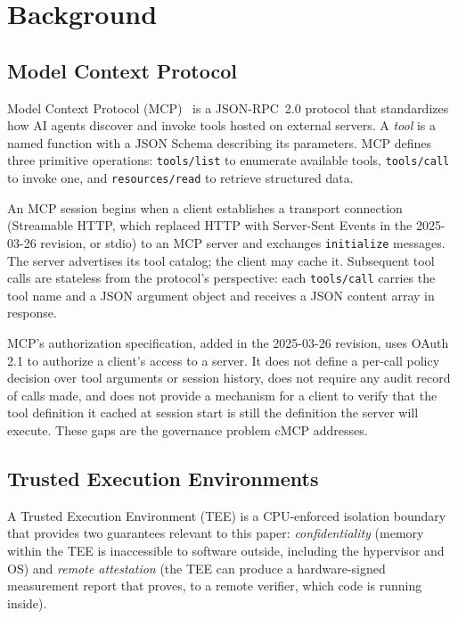 \section{Background}
\label{sec:background}

\subsection{Model Context Protocol}

Model Context Protocol (MCP)~\citep{mcp2024} is a JSON-RPC~2.0 protocol that standardizes
how AI agents discover and invoke tools hosted on external servers. A \emph{tool} is a named
function with a JSON Schema describing its parameters. MCP defines three primitive operations:
\texttt{tools/list} to enumerate available tools, \texttt{tools/call} to invoke one, and
\texttt{resources/read} to retrieve structured data.

An MCP session begins when a client establishes a transport connection (Streamable HTTP,
which replaced HTTP with Server-Sent Events in the 2025-03-26 revision, or stdio) to an MCP
server and exchanges \texttt{initialize} messages.
The server advertises its tool catalog; the client may cache it. Subsequent tool calls are
stateless from the protocol's perspective: each \texttt{tools/call} carries the tool name
and a JSON argument object and receives a JSON content array in response.

MCP's authorization specification, added in the 2025-03-26 revision, uses OAuth 2.1 to
authorize a client's access to a server. It does not define a per-call policy decision over
tool arguments or session history, does not require any audit record of calls made, and
does not provide a mechanism for a client to verify that the tool definition it cached at
session start is still the definition the server will execute. These gaps are the governance problem
cMCP addresses.

\subsection{Trusted Execution Environments}

A Trusted Execution Environment (TEE) is a CPU-enforced isolation boundary that provides
two guarantees relevant to this paper: \emph{confidentiality} (memory within the TEE is
inaccessible to software outside, including the hypervisor and OS) and
\emph{remote attestation} (the TEE can produce a hardware-signed measurement report that
proves, to a remote verifier, which code is running inside).

